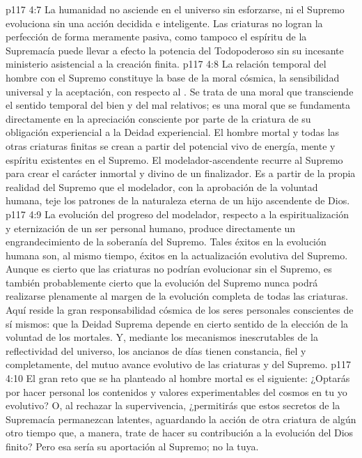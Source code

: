 \vs p117 4:7 \pc La humanidad no asciende en el universo sin esforzarse, ni el Supremo evoluciona sin una acción decidida e inteligente. Las criaturas no logran la perfección de forma meramente pasiva, como tampoco el espíritu de la Supremacía puede llevar a efecto la potencia del Todopoderoso sin su incesante ministerio asistencial a la creación finita.
\vs p117 4:8 La relación temporal del hombre con el Supremo constituye la base de la moral cósmica, la sensibilidad universal y la aceptación, con respecto al . Se trata de una moral que transciende el sentido temporal del bien y del mal relativos; es una moral que se fundamenta directamente en la apreciación consciente por parte de la criatura de su obligación experiencial a la Deidad experiencial. El hombre mortal y todas las otras criaturas finitas se crean a partir del potencial vivo de energía, mente y espíritu existentes en el Supremo. El modelador\hyp{}ascendente recurre al Supremo para crear el carácter inmortal y divino de un finalizador. Es a partir de la propia realidad del Supremo que el modelador, con la aprobación de la voluntad humana, teje los patrones de la naturaleza eterna de un hijo ascendente de Dios.
\vs p117 4:9 La evolución del progreso del modelador, respecto a la espiritualización y eternización de un ser personal humano, produce directamente un engrandecimiento de la soberanía del Supremo. Tales éxitos en la evolución humana son, al mismo tiempo, éxitos en la actualización evolutiva del Supremo. Aunque es cierto que las criaturas no podrían evolucionar sin el Supremo, es también probablemente cierto que la evolución del Supremo nunca podrá realizarse plenamente al margen de la evolución completa de todas las criaturas. Aquí reside la gran responsabilidad cósmica de los seres personales conscientes de sí mismos: que la Deidad Suprema depende en cierto sentido de la elección de la voluntad de los mortales. Y, mediante los mecanismos inescrutables de la reflectividad del universo, los ancianos de días tienen constancia, fiel y completamente, del mutuo avance evolutivo de las criaturas y del Supremo.
\vs p117 4:10 El gran reto que se ha planteado al hombre mortal es el siguiente: ¿Optarás por hacer personal los contenidos y valores experimentables del cosmos en tu yo evolutivo? O, al rechazar la supervivencia, ¿permitirás que estos secretos de la Supremacía permanezcan latentes, aguardando la acción de otra criatura de algún otro tiempo que, a  manera, trate de hacer su contribución a la evolución del Dios finito? Pero esa sería su aportación al Supremo; no la tuya.
